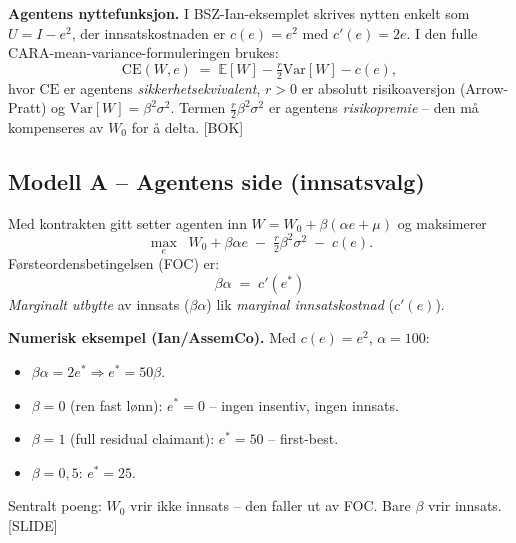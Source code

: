 \textbf{Agentens nyttefunksjon.} I BSZ-Ian-eksemplet skrives nytten enkelt som $U=I-e^{2}$, der innsatskostnaden er $c(e)=e^{2}$ med $c'(e)=2e$. I den fulle CARA-mean-variance-formuleringen brukes:
\[
\mathrm{CE}(W,e)\;=\;\mathbb{E}[W]-\tfrac{r}{2}\mathrm{Var}[W]-c(e),
\]
hvor $\mathrm{CE}$ er agentens \emph{sikkerhetsekvivalent}, $r>0$ er absolutt risikoaversjon (Arrow-Pratt) og $\mathrm{Var}[W]=\beta^{2}\sigma^{2}$. Termen $\tfrac{r}{2}\beta^{2}\sigma^{2}$ er agentens \emph{risikopremie} -- den må kompenseres av $W_0$ for å delta. [BOK]

\subsection*{Modell A -- Agentens side (innsatsvalg)}

Med kontrakten gitt setter agenten inn $W=W_0+\beta(\alpha e+\mu)$ og maksimerer
\[
\max_{e}\;\; W_0+\beta\alpha e\;-\;\tfrac{r}{2}\beta^{2}\sigma^{2}\;-\;c(e).
\]
Førsteordensbetingelsen (FOC) er:
\begin{equation}\label{eq:agent-foc}
\boxed{\;\beta\alpha \;=\; c'(e^{*})\;}
\end{equation}
\emph{Marginalt utbytte} av innsats ($\beta\alpha$) lik \emph{marginal innsatskostnad} ($c'(e)$).

\textbf{Numerisk eksempel (Ian/AssemCo).} Med $c(e)=e^{2}$, $\alpha=100$:
\begin{itemize}\setlength{\itemsep}{2pt}
\item $\beta\alpha=2e^{*}\Rightarrow e^{*}=50\beta$.
\item $\beta=0$ (ren fast lønn): $e^{*}=0$ -- ingen insentiv, ingen innsats.
\item $\beta=1$ (full residual claimant): $e^{*}=50$ -- first-best.
\item $\beta=0{,}5$: $e^{*}=25$.
\end{itemize}
Sentralt poeng: $W_0$ vrir ikke innsats -- den faller ut av FOC. Bare $\beta$ vrir innsats. [SLIDE]

